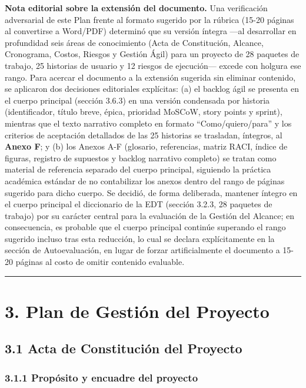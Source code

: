 \documentclass[11pt,a4paper]{article}
\begin{document}
\textbf{Nota editorial sobre la extensión del documento.} Una verificación adversarial de este Plan frente al formato sugerido por la rúbrica (15-20 páginas al convertirse a Word/PDF) determinó que su versión íntegra ---al desarrollar en profundidad seis áreas de conocimiento (Acta de Constitución, Alcance, Cronograma, Costos, Riesgos y Gestión Ágil) para un proyecto de 28 paquetes de trabajo, 25 historias de usuario y 12 riesgos de ejecución--- excede con holgura ese rango. Para acercar el documento a la extensión sugerida sin eliminar contenido, se aplicaron dos decisiones editoriales explícitas: (a) el backlog ágil se presenta en el cuerpo principal (sección 3.6.3) en una versión condensada por historia (identificador, título breve, épica, prioridad MoSCoW, story points y sprint), mientras que el texto narrativo completo en formato ``Como/quiero/para'' y los criterios de aceptación detallados de las 25 historias se trasladan, íntegros, al \textbf{Anexo F}; y (b) los Anexos A-F (glosario, referencias, matriz RACI, índice de figuras, registro de supuestos y backlog narrativo completo) se tratan como material de referencia separado del cuerpo principal, siguiendo la práctica académica estándar de no contabilizar los anexos dentro del rango de páginas sugerido para dicho cuerpo. Se decidió, de forma deliberada, mantener íntegro en el cuerpo principal el diccionario de la EDT (sección 3.2.3, 28 paquetes de trabajo) por su carácter central para la evaluación de la Gestión del Alcance; en consecuencia, es probable que el cuerpo principal continúe superando el rango sugerido incluso tras esta reducción, lo cual se declara explícitamente en la sección de Autoevaluación, en lugar de forzar artificialmente el documento a 15-20 páginas al costo de omitir contenido evaluable.

\begin{center}\rule{0.5\linewidth}{0.5pt}\end{center}

\section{3. Plan de Gestión del Proyecto}\label{plan-de-gestiuxf3n-del-proyecto}

\subsection{3.1 Acta de Constitución del Proyecto}\label{acta-de-constituciuxf3n-del-proyecto}

\subsubsection{3.1.1 Propósito y encuadre del proyecto}\label{propuxf3sito-y-encuadre-del-proyecto}
\end{document}
